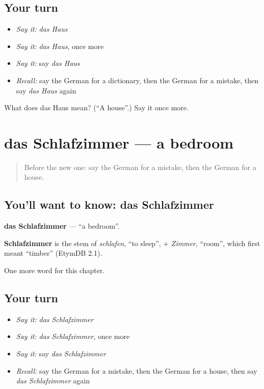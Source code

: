 \subsection*{Your turn}
\begin{itemize}
\raggedright
  \item \emph{Say it:} \emph{das Haus}
  \item \emph{Say it:} \emph{das Haus}, once more
  \item \emph{Say it:} say \emph{das Haus}
  \item \emph{Recall:} say the German for a dictionary, then the German for a mistake, then say \emph{das Haus} again
\end{itemize}

\begin{tcolorbox}[breakable,colback=teal!4,colframe=teal!35!black,title={Before you move on}]
What does das Haus mean? (\textquotedblleft{}A house\textquotedblright{}.) Say it once more.
\end{tcolorbox}
\section[das Schlafzimmer]{das Schlafzimmer — a bedroom}

\label{lesson:GE-C161-schlafzimmer}



\begin{quote}
Before the new one: say the German for a mistake, then the German for a house.
\end{quote}

\subsection*{You'll want to know: das Schlafzimmer}
\textbf{das Schlafzimmer} — \textquotedblleft{}a bedroom\textquotedblright{}.

\begin{cousinweb}
\textbf{Schlafzimmer} is the stem of \emph{schlafen}, \textquotedblleft{}to sleep\textquotedblright{}, + \emph{Zimmer}, \textquotedblleft{}room\textquotedblright{}, which first meant \textquotedblleft{}timber\textquotedblright{} (EtymDB 2.1).
\end{cousinweb}

\begin{grammarlens}[title={What you've built}]
One more word for this chapter.
\end{grammarlens}

\subsection*{Your turn}
\begin{itemize}
\raggedright
  \item \emph{Say it:} \emph{das Schlafzimmer}
  \item \emph{Say it:} \emph{das Schlafzimmer}, once more
  \item \emph{Say it:} say \emph{das Schlafzimmer}
  \item \emph{Recall:} say the German for a mistake, then the German for a house, then say \emph{das Schlafzimmer} again
\end{itemize}

